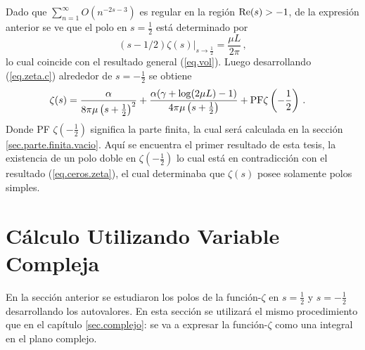 Dado que $\sum _{n=1} ^{\infty} O \left( n ^{-2s-3} \right)$ es regular en la región  ${\rm Re }(s) > -1$, de la expresión anterior se ve que el polo en $s=  \frac{1}{2}$ está determinado por
\begin{equation}\label{eq.res.2}
    ( s-1/2 ) \zeta  (s) | _{s \rightarrow \frac{1}{2}} = 
    \frac{\mu L }{2 \pi}
    	\, ,
\end{equation}
lo cual coincide con el resultado general (\ref{eq.vol}). Luego desarrollando (\ref{eq.zeta.c}) alrededor de $s=-\frac{1}{2}$ se obtiene
\begin{align}\label{eq.res.1}
    &\zeta  (s) =  \frac{\alpha}{8  \pi \mu \left(s+\frac{1}{2} \right)^2} +
    \frac{ \alpha ( \gamma  +  \log (2\mu L ) -1 ) }
    	{4  \pi \mu \left(s+\frac{1}{2} \right) }  + 
	{\rm PF }\zeta \left(- \frac{1}{2} \right)
    	\, .
\end{align}
Donde PF $\zeta \left(- \frac{1}{2} \right)$ significa la parte finita, la cual será calculada en la sección \ref{sec.parte.finita.vacio}.
Aquí se encuentra el primer resultado de esta tesis, la existencia de un polo doble en $\zeta \left( -\frac{1}{2} \right)$ lo cual está en contradicción con el resultado (\ref{eq.ceros.zeta}), el cual determinaba que $\zeta (s)$ posee solamente polos simples.

\section{Cálculo Utilizando Variable Compleja}\label{seq.2.com}


En la sección anterior se estudiaron los polos de la función-$\zeta$ en $s=\frac{1}{2}$ y $s=-\frac{1}{2}$ desarrollando los autovalores.
En esta sección se utilizará el mismo procedimiento que en el capítulo \ref{sec.complejo}: se va a expresar la función-$\zeta $ como una integral en el plano complejo.

